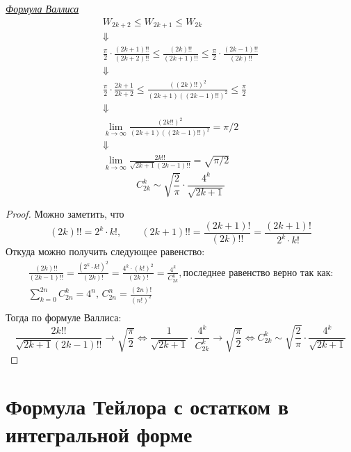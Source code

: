 \begin{example}
\underline{\textit{Формула Валлиса}}
\[
    \begin{gathered}
        W_{2k + 2} \leqslant W_{2k + 1} \leqslant W_{2k}\\
        \Downarrow\\
        \frac{\pi}{2} \cdot \frac{(2k + 1)!!}{(2k + 2)!!} \leqslant \frac{(2k)!!}{(2k + 1)!!} \leqslant
        \frac{\pi}{2} \cdot \frac{(2k - 1)!!}{(2k)!!}\\
        \Downarrow\\
        \frac{\pi}{2} \cdot \frac{2k + 1}{2k + 2} \leqslant \frac{((2k)!!)^2}{(2k + 1)((2k - 1)!!) ^ 2} \leqslant \frac{\pi}{2}\\
        \Downarrow\\
        \lim_{k \to \infty} \frac{(2k!!)^2}{(2k + 1)((2k - 1)!!) ^ 2} = \pi / 2\\
        \Downarrow\\
        \lim_{k \to \infty} \frac{2k!!}{\sqrt{2k + 1}(2k - 1)!!} = \sqrt{\pi / 2}
    \end{gathered}
\]
\follow 
\[
    C_{2k}^k \sim \sqrt{\frac{2}{\pi}} \cdot \frac{4 ^ k}{\sqrt{2k + 1}}
\]
\begin{proof}
     Можно заметить, что
    \[
        (2k)!! = 2 ^ k \cdot k!,\qquad
        (2k + 1)!! = \frac{(2k + 1)!}{(2k)!!} = \frac{(2k + 1)!}{2^k \cdot k!}
    \]
    Откуда можно получить следующее равенство:
    \[
        \begin{gathered}
            \frac{(2k)!!}{(2k - 1)!!} = \frac{(2^k \cdot k!)^2}{(2k)!} = \frac{4 ^ k \cdot (k!)^2}{(2k)!}
            = \frac{4 ^ k}{C_{2k}^k}, \text{последнее равенство верно так как:}\\
            \sum_{k = 0}^{2n} C_{2n}^{k} = 4 ^ n, \,
            C_{2n}^n = \frac{(2n)!}{(n!)^2}\\
        \end{gathered}
    \]
    Тогда по формуле Валлиса:
    \[
        \frac{2k!!}{\sqrt{2k + 1}(2k - 1)!!} \to \sqrt{\frac{\pi}{2}}
        \Leftrightarrow 
        \frac{1}{\sqrt{2k + 1}} \cdot \frac{4 ^ k}{C_{2k}^k} \to \sqrt{\frac{\pi}{2}}
        \Leftrightarrow 
        C_{2k}^k \sim \sqrt{\frac{2}{\pi}} \cdot \frac{4 ^ k}{\sqrt{2k + 1}}
    \]
\end{proof}
\end{example}
\newpage

\section{Формула Тейлора с остатком в интегральной форме}

